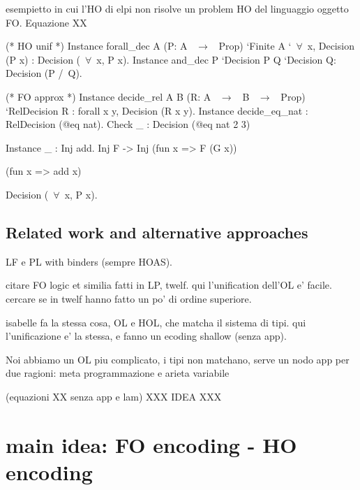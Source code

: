 \documentclass{rapport}
\begin{document}
esempietto in cui l'HO di elpi non risolve un problem HO del linguaggio
oggetto FO. Equazione XX


\begin{coqcode}
(* HO unif *)
Instance forall_dec A (P: A ~$\to$~ Prop) `{Finite A} `{~$\forall$~x, Decision (P x)} :
  Decision (~$\forall$~x, P x).
Instance and_dec P `{Decision P} Q `{Decision Q}:  Decision (P /\ Q).



(* FO approx *)
Instance decide_rel A B (R: A ~$\to$~ B ~$\to$~ Prop) `{RelDecision R} :
  forall x y, Decision (R x y).
Instance decide_eq_nat : RelDecision (@eq nat).
Check _ : Decision (@eq nat 2 3)


Instance _ : Inj add.
             Inj F -> Inj (fun x => F (G x))

             (fun x => add x)


  Decision (~$\forall$~x, P x).

\end{coqcode}

\subsection{Related work and alternative approaches}

LF e PL with binders (sempre HOAS).

citare FO logic et similia fatti in LP, twelf. qui l'unification dell'OL
e' facile. cercare se in twelf hanno fatto un po' di ordine superiore.

isabelle fa la stessa cosa, OL e HOL, che matcha il sistema di tipi.
qui l'unificazione e' la stessa, e fanno un ecoding shallow (senza app).

Noi abbiamo un OL piu complicato, i tipi non matchano, serve un nodo app
per due ragioni: meta programmazione e arieta variabile

(equazioni XX senza app e lam) XXX IDEA XXX

\section{main idea: FO encoding - HO encoding}
\end{document}
